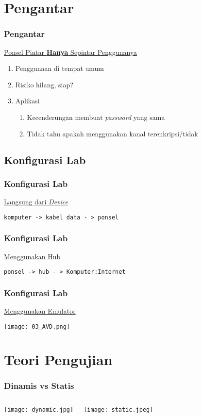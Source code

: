 \documentclass[xcolor=pdftex,table,10pt]{beamer}
\begin{document}
\section{Pengantar}
\begin{frame}
	\frametitle{Pengantar}
	\underline{Ponsel Pintar \textbf{Hanya} Sepintar Penggunanya}
	\begin{enumerate}
		\item Penggunaan di tempat umum
		\item Risiko hilang, siap?
		\item Aplikasi
		\begin{enumerate}
			\item Kecenderungan membuat \textit{password} yang sama
			\item Tidak tahu apakah menggunakan kanal terenkripsi/tidak
		\end{enumerate}
	\end{enumerate}
\end{frame}

\subsection{Konfigurasi Lab}
\begin{frame}
	\frametitle{Konfigurasi Lab}
	\underline{Langsung dari \textit{Device}} \vskip1.5cm
	\begin{center}
\texttt{komputer -> kabel data - > ponsel}
\end{center}
\end{frame}

\begin{frame}
	\frametitle{Konfigurasi Lab}
	\underline{Menggunakan Hub} \vskip1.5cm
	\begin{center}
\texttt{ponsel -> hub - > Komputer:Internet}
\end{center}
\end{frame}


\begin{frame}
	\frametitle{Konfigurasi Lab}
	\underline{Menggunakan Emulator}
	\begin{center}
		\texttt{[image: 03\_AVD.png]}
	\end{center}
\end{frame}


\section{Teori Pengujian}

\begin{frame}
	\frametitle{Dinamis vs Statis}
	\begin{columns}	
		\begin{flushright} \texttt{[image: dynamic.jpg]} \end{flushright}
		\begin{flushleft}
\texttt{[image: static.jpeg]}
\end{flushleft}
	\end{columns}
\end{frame}
\end{document}
